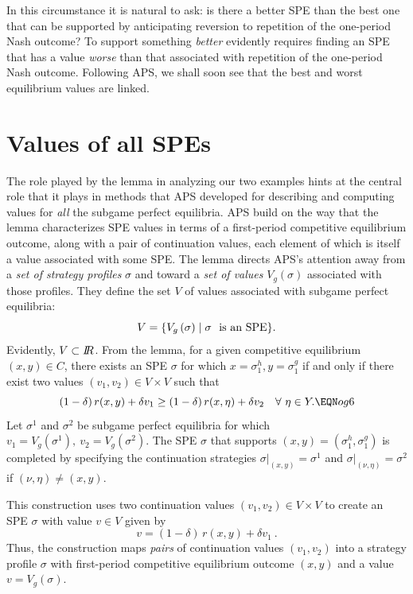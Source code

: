 In this circumstance it is natural to ask: is there  a better SPE than  the best one that can be supported by anticipating reversion to repetition
of the one-period Nash outcome?
 To support something {\it better\/} evidently requires finding an SPE
that has a value {\it worse\/} than that
associated with repetition of the one-period Nash outcome.
  Following APS, we shall soon
see that the best and worst equilibrium values are linked.

    
\section{Values of all SPEs}
The role played by the lemma in analyzing our two examples
hints at the central role that it plays in  methods
that APS  developed for describing
and computing  values for
 {\it all\/} the subgame perfect equilibria.  APS build on the way that the lemma
characterizes SPE values in terms of a first-period competitive  equilibrium
outcome, along with a pair of continuation values, each element of
which is itself a value associated with some SPE. The lemma
directs APS's attention away from a {\it set of strategy
profiles\/}  $\sigma$ and toward a {\it set of values\/}
 $V_g(\sigma)$ associated
with those profiles.  They define the set $V$ of values associated with
subgame perfect equilibria:
$$V=\{ V_g\, (\sigma)\mid \sigma\ \hbox{ is an SPE}
\}.$$
Evidently, $V\subset {{I\kern-0.3em R}}$.  From the lemma, for a given competitive equilibrium $(x,y)\in C$,
there exists an SPE $\sigma$ for which $x=\sigma^h_1,
y=\sigma^g_1$ if and only if there exist two values $(v_1,v_2)\in V\times V$
 such that
$$(1-\delta)\, r(x,y) + \delta v_1\geq (1-\delta)\, r(x,\eta) + \delta
v_2\quad \forall\ \eta\in Y . \EQN og6$$
Let $\sigma^1$ and $\sigma^2$ be subgame perfect equilibria for which $v_1 =
V_g(\sigma^1),\ v_2=V_g(\sigma^2)$.  The SPE $\sigma$
that supports $(x,y) = (\sigma^h_1,\sigma^g_1)$ is completed by specifying the continuation strategies
$\sigma\vert_{(x,y)} = \sigma^1$ and $\sigma\vert_{(\nu,\eta)} = \sigma^2$ if
$(\nu,\eta) \not= (x,y)$.

This construction uses  two continuation values $(v_1,v_2)\in V \times V$ to create an SPE
$\sigma$ with value $v\in V$ given by
$$v = (1-\delta)\, r(x,y) + \delta v_1\ .$$
Thus, the construction maps {\it pairs\/} of continuation values
 $(v_1,v_2)$ into a strategy profile $\sigma$  with
first-period competitive equilibrium outcome $(x,y)$
and a value $v=V_g(\sigma)$.

